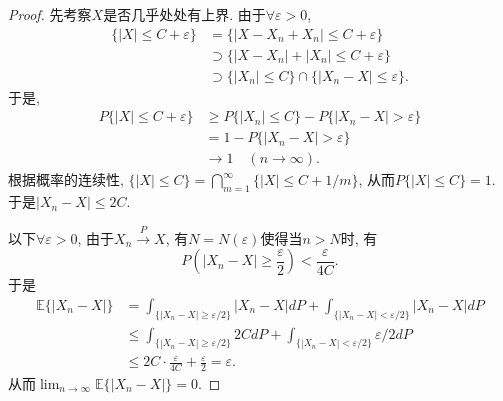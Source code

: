 \documentclass[UTF8, a4paper]{article}
\begin{document}
\begin{proof}
先考察\(X\)是否几乎处处有上界. 由于\(\forall \varepsilon > 0\),
$$
\begin{aligned}
    \{|X| \leq C + \varepsilon\} &= \{|X-X_n +X_n| \leq  C + \varepsilon\} \\
    &\supset \{|X-X_n| + |X_n| \leq C + \varepsilon\} \\
    &\supset \{|X_n| \leq C\} \cap \{|X_n - X| \leq \varepsilon\}.
\end{aligned}
$$
于是, 
\begin{align*}
    P\{|X| \leq C + \varepsilon\} &\geq P\{|X_n| \leq C\} - P\{|X_n - X| > \varepsilon\} \\
    & = 1 - P\{|X_n - X| > \varepsilon\} \\
    &\to 1 \quad (n\to \infty).
\end{align*}
根据概率的连续性, \(\{|X| \leq C\} = \bigcap_{m = 1}^\infty \{|X| \leq C + 1/m\}\), 从而\(P\{|X| \leq C\} = 1\). 于是\(|X_n - X| \leq 2C\).

以下\(\forall \varepsilon > 0\), 由于\(X_n \overset{P}{\to} X\), 有\(N = N(\varepsilon)\)使得当\(n > N\)时, 有
$$
P\left(|X_n - X| \geq \frac{\varepsilon}{2}\right) < \frac{\varepsilon}{4C}.
$$
于是
$$
\begin{aligned}
    \mathbb{E}\{|X_n - X|\} &= \int_{\{|X_n - X| \geq \varepsilon/2\}} |X_n - X| dP + \int_{\{|X_n - X| < \varepsilon/2\}} |X_n - X| dP \\
    &\leq \int_{\{|X_n - X| \geq \varepsilon/2\}} 2C dP + \int_{\{|X_n - X| < \varepsilon/2\}} \varepsilon/2 dP \\
    &\leq 2C \cdot \frac{\varepsilon}{4C} + \frac{\varepsilon}{2} = \varepsilon.
\end{aligned}
$$
从而\(\lim_{n\to\infty} \mathbb{E}\{|X_n - X|\} = 0\).
\end{proof}








\end{document}
